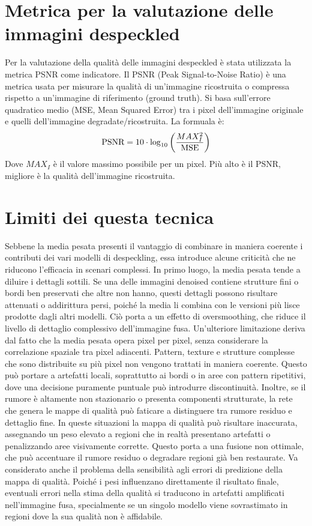 \section{Metrica per la valutazione delle immagini despeckled}
Per la valutazione della qualità delle immagini despeckled è stata utilizzata la metrica PSNR come indicatore.
Il PSNR (Peak Signal-to-Noise Ratio) è una metrica usata per misurare la qualità di un’immagine ricostruita o 
compressa rispetto a un’immagine di riferimento (ground truth). 
Si basa sull’errore quadratico medio (MSE, Mean Squared Error) tra i pixel dell’immagine originale e 
quelli dell’immagine degradate/ricostruita. La formuala è: 
\begin{equation}
  \makebox[\textwidth][c]{%
    $\displaystyle
    \text{PSNR} = 10 \cdot \log_{10} \left( \frac{MAX_I^2}{\text{MSE}} \right)
    $%
  }
\end{equation}
Dove $MAX_I$ è il valore massimo possibile per un pixel. Più alto è il PSNR, migliore è la qualità dell’immagine ricostruita.

\section{Limiti dei questa tecnica}
Sebbene la media pesata presenti il vantaggio di combinare in maniera coerente i contributi dei vari modelli di despeckling, 
essa introduce alcune criticità che ne riducono l’efficacia in scenari complessi.
In primo luogo, la media pesata tende a diluire i dettagli sottili. Se una delle immagini denoised contiene strutture fini 
o bordi ben preservati che altre non hanno, questi dettagli possono risultare attenuati o addirittura persi, poiché la 
media li combina con le versioni più lisce prodotte dagli altri modelli. Ciò porta a un effetto di oversmoothing, che riduce 
il livello di dettaglio complessivo dell’immagine fusa.
Un’ulteriore limitazione deriva dal fatto che la media pesata opera pixel per pixel, senza considerare la correlazione spaziale 
tra pixel adiacenti. Pattern, texture e strutture complesse che sono distribuite su più pixel non vengono trattati in maniera 
coerente. Questo può portare a artefatti locali, soprattutto ai bordi o in aree con pattern ripetitivi, dove una decisione 
puramente puntuale può introdurre discontinuità.
Inoltre, se il rumore è altamente non stazionario o presenta componenti strutturate, la rete che genera le mappe di qualità 
può faticare a distinguere tra rumore residuo e dettaglio fine. In queste situazioni la mappa di qualità può risultare 
inaccurata, assegnando un peso elevato a regioni che in realtà presentano artefatti o penalizzando aree visivamente corrette. 
Questo porta a una fusione non ottimale, che può accentuare il rumore residuo o degradare regioni già ben restaurate.
Va considerato anche il problema della sensibilità agli errori di predizione della mappa di qualità. Poiché i pesi influenzano 
direttamente il risultato finale, eventuali errori nella stima della qualità si traducono in artefatti amplificati nell’immagine 
fusa, specialmente se un singolo modello viene sovrastimato in regioni dove la sua qualità non è affidabile.


